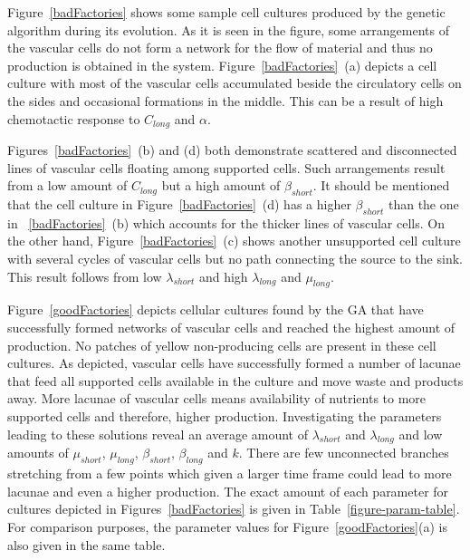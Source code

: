 Figure~\ref{badFactories} shows some sample cell cultures produced by the genetic algorithm during its evolution. As it is seen in the figure, some arrangements of the vascular cells do not form a network for the flow of material and thus no production is obtained in the system. Figure~\ref{badFactories}~(a) depicts a cell culture with most of the vascular cells accumulated beside the circulatory cells on the sides and occasional formations in the middle. This can be a result of high chemotactic response to $C_{long}$ and $\alpha$.

Figures~\ref{badFactories}~(b) and (d) both demonstrate scattered and disconnected lines of vascular cells floating among supported cells. Such arrangements result from a low amount of $C_{long}$ but a high amount of $\beta_{short}$. It should be mentioned that the cell culture in Figure~\ref{badFactories}~(d) has a higher $\beta_{short}$ than the one in ~\ref{badFactories}~(b) which accounts for the thicker lines of vascular cells. On the other hand, Figure~\ref{badFactories}~(c) shows another unsupported cell culture with several cycles of vascular cells but no path connecting the source to the sink. This result follows from low $\lambda_{short}$ and high $\lambda_{long}$ and $\mu_{long}$.

Figure~\ref{goodFactories} depicts cellular cultures found by the GA that have successfully formed networks of vascular cells and reached the highest amount of production. No patches of yellow non-producing cells are present in these cell cultures. As depicted, vascular cells have successfully formed a number of lacunae that feed all supported cells available in the culture and move waste and products away. More lacunae of vascular cells means availability of nutrients to more supported cells and therefore, higher production. Investigating the parameters leading to these solutions reveal an average amount of $\lambda_{short}$ and $\lambda_{long}$ and low amounts of $\mu_{short}$, $\mu_{long}$, $\beta_{short}$, $\beta_{long}$ and $k$. There are few unconnected branches stretching from a few points which given a larger time frame could lead to more lacunae and even a higher production. The exact amount of each parameter for cultures depicted in Figures~\ref{badFactories} is given in Table~\ref{figure-param-table}. For comparison purposes, the parameter values for Figure~\ref{goodFactories}(a) is also given in the same table.

